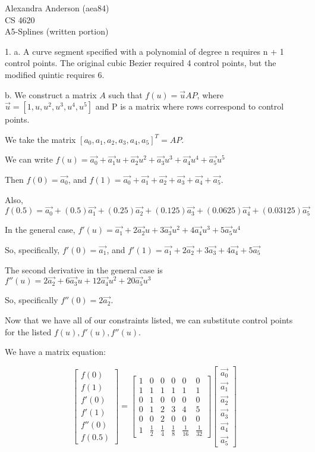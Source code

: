 \documentclass{letter}
\begin{document}
Alexandra Anderson (aea84) \\
CS 4620 \\
A5-Splines (written portion)

1. a. A curve segment specified with a polynomial of degree n requires n + 1 control points. The original cubic Bezier required 4 control points, but the modified quintic requires 6. 

b. We construct a matrix $A$ such that $f(u) = \vec{u}AP$, where $\vec{u} = [1, u, u^2, u^3, u^4, u^5]$ and P is a matrix where rows correspond to control points. 

We take the matrix $[a_0, a_1, a_2, a_3, a_4, a_5]^T = AP$.

We can write $f(u) = \vec{a_0} + \vec{a_1}u + \vec{a_2}u^2 + \vec{a_3}u^3 + \vec{a_4}u^4 + \vec{a_5}u^5$

Then $f(0) = \vec{a_0}$, and $f(1) = \vec{a_0} + \vec{a_1} + \vec{a_2} + \vec{a_3} + \vec{a_4} + \vec{a_5}$. 

Also, $f(0.5) =  \vec{a_0} + (0.5)\vec{a_1} + (0.25)\vec{a_2} + (0.125)\vec{a_3} + (0.0625)\vec{a_4} + (0.03125)\vec{a_5}$

In the general case, $f'(u) = \vec{a_1} + 2\vec{a_2}u + 3\vec{a_3}u^2 + 4\vec{a_4}u^3 + 5\vec{a_5}u^4$

So, specifically, $f'(0) = \vec{a_1}$, and $f'(1) = \vec{a_1} + 2\vec{a_2} + 3\vec{a_3} + 4\vec{a_4} + 5\vec{a_5}$

The second derivative in the general case is $f''(u) = 2\vec{a_2} + 6\vec{a_3}u + 12\vec{a_4}u^2 + 20\vec{a_5}u^3$

So, specifically $f''(0) = 2\vec{a_2}$. 

Now that we have all of our constraints listed, we can substitute control points for the listed $f(u), f'(u), f''(u)$. 

We have a matrix equation:

$$
\begin{bmatrix}
f(0) \\
f(1) \\
f'(0) \\
f'(1) \\
f''(0) \\
f(0.5)
\end{bmatrix}
=
\begin{bmatrix}
1 & 0 & 0 & 0 & 0 & 0 \\
1 & 1 & 1 & 1 & 1 & 1 \\
0 & 1 & 0 & 0 & 0 & 0 \\
0 & 1 & 2 & 3 & 4 & 5 \\
0 & 0 & 2 & 0 & 0 & 0 \\
1 & \frac{1}{2} & \frac{1}{4} & \frac{1}{8} & \frac{1}{16} & \frac{1}{32} 
\end{bmatrix}
\begin{bmatrix}
\vec{a_0} \\
\vec{a_1} \\
\vec{a_2} \\
\vec{a_3} \\
\vec{a_4} \\
\vec{a_5} 
\end{bmatrix}
$$
\end{document}
